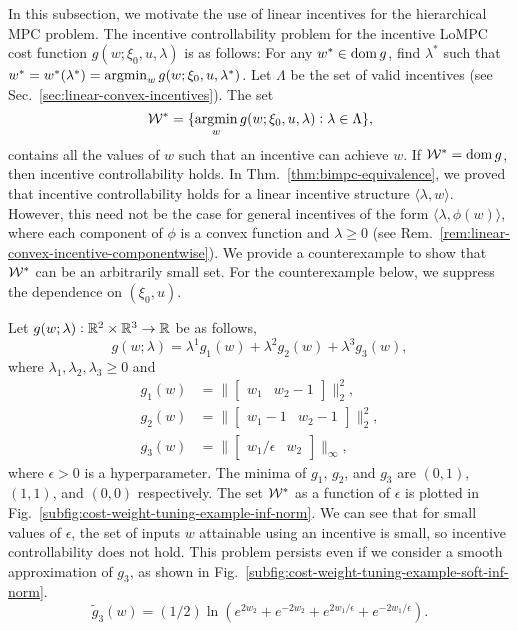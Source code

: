 In this subsection, we motivate the use of linear incentives for the hierarchical MPC problem.
The incentive controllability problem for the incentive LoMPC cost function $g(w; \xi_0, u, \lambda)$ is as follows:
For any $w^* \in \operatorname{dom} g$, find $\lambda^*$ such that $w^* = w^*(\lambda^*) = \operatorname*{argmin}_w g(w; \xi_0, u, \lambda^*)$.
Let $\Lambda$ be the set of valid incentives (see Sec.~\ref{sec:linear-convex-incentives}).
The set 
\begin{equation}
\label{eq:cost-weight-tuning-example-w-star}
\mathcal{W}^* = \{\operatorname*{argmin}_w g(w; \xi_0, u, \lambda): \lambda \in \Lambda\},
\end{equation}
contains all the values of $w$ such that an incentive can achieve $w$.
If $\mathcal{W}^* = \operatorname{dom} g$, then incentive controllability holds.
In Thm.~\ref{thm:bimpc-equivalence}, we proved that incentive controllability holds for a linear incentive structure $\langle \lambda, w\rangle$.
However, this need not be the case for general incentives of the form $\langle \lambda, \phi(w)\rangle$, where each component of $\phi$ is a convex function and $\lambda \geq 0$ (see Rem.~\ref{rem:linear-convex-incentive-componentwise}).
We provide a counterexample to show that $\mathcal{W}^*$ can be an arbitrarily small set.
For the counterexample below, we suppress the dependence on $(\xi_0, u)$.

Let $g(w; \lambda): \mathbb{R}^2 \times \mathbb{R}^3 \rightarrow \mathbb{R}$ be as follows,
\begin{equation}
\label{eq:cost-weight-tuning-example}
    g(w; \lambda) = \lambda^1 g_1(w) + \lambda^2 g_2(w) + \lambda^3 g_3(w),
\end{equation}
where $\lambda_1, \lambda_2, \lambda_3 \geq 0$ and
\begin{align}
\label{eq:cost-weight-tuning-example-costs}
    g_1(w) & = \lVert \begin{bmatrix}w_1 & w_2-1\end{bmatrix} \rVert^2_2, \nonumber \\
    g_2(w) & = \lVert \begin{bmatrix}w_1-1 & w_2-1\end{bmatrix} \rVert^2_2, \\
    g_3(w) & = \lVert \begin{bmatrix}w_1/\epsilon & w_2\end{bmatrix} \rVert_\infty, \nonumber
\end{align}
where $\epsilon > 0$ is a hyperparameter.
The minima of $g_1$, $g_2$, and $g_3$ are $(0,1)$, $(1,1)$, and $(0,0)$ respectively.
The set $\mathcal{W}^*$ as a function of $\epsilon$ is plotted in Fig.~\ref{subfig:cost-weight-tuning-example-inf-norm}.
We can see that for small values of $\epsilon$, the set of inputs $w$ attainable using an incentive is small, so incentive controllability does not hold.
This problem persists even if we consider a smooth approximation of $g_3$, as shown in Fig.~\ref{subfig:cost-weight-tuning-example-soft-inf-norm}.
\begin{equation}
\label{eq:cost-weight-tuning-example-soft-cost}
    \tilde{g}_3(w) = (1/2) \ln(e^{2w_2} + e^{-2w_2} + e^{2w_1/\epsilon} + e^{-2w_1/\epsilon}).
\end{equation}

